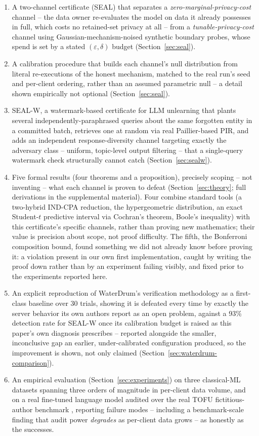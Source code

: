 \documentclass[10pt,journal,compsoc]{IEEEtran}
\begin{document}
\begin{enumerate}
\item A two-channel certificate (SEAL) that separates a \emph{zero-marginal-privacy-cost} channel -- the data owner re-evaluates the model on data it already possesses in full, which costs no retained-set privacy at all -- from a \emph{tunable-privacy-cost} channel using Gaussian-mechanism-noised synthetic boundary probes, whose spend is set by a stated $(\varepsilon,\delta)$ budget (Section~\ref{sec:seal}).
\item A calibration procedure that builds each channel's null distribution from literal re-executions of the honest mechanism, matched to the real run's seed and per-client ordering, rather than an assumed parametric null -- a detail shown empirically not optional (Section~\ref{sec:seal}).
\item SEAL-W, a watermark-based certificate for LLM unlearning that plants several independently-paraphrased queries about the same forgotten entity in a committed batch, retrieves one at random via real Paillier-based PIR, and adds an independent response-diversity channel targeting exactly the adversary class -- uniform, topic-level output filtering -- that a single-query watermark check structurally cannot catch (Section~\ref{sec:sealw}).
\item Five formal results (four theorems and a proposition), precisely scoping -- not inventing -- what each channel is proven to defeat (Section~\ref{sec:theory}; full derivations in the supplemental material). Four combine standard tools (a two-hybrid IND-CPA reduction, the hypergeometric distribution, an exact Student-$t$ predictive interval via Cochran's theorem, Boole's inequality) with this certificate's specific channels, rather than proving new mathematics; their value is precision about scope, not proof difficulty. The fifth, the Bonferroni composition bound, found something we did not already know before proving it: a violation present in our own first implementation, caught by writing the proof down rather than by an experiment failing visibly, and fixed prior to the experiments reported here.
\item An explicit reproduction of WaterDrum's verification methodology \cite{lu2026waterdrum} as a first-class baseline over 30 trials, showing it is defeated every time by exactly the server behavior its own authors report as an open problem, against a 93\% detection rate for SEAL-W once its calibration budget is raised as this paper's own diagnosis prescribes -- reported alongside the smaller, inconclusive gap an earlier, under-calibrated configuration produced, so the improvement is shown, not only claimed (Section~\ref{sec:waterdrum-comparison}).
\item An empirical evaluation (Section~\ref{sec:experiments}) on three classical-ML datasets spanning three orders of magnitude in per-client data volume, and on a real fine-tuned language model audited over the real TOFU fictitious-author benchmark \cite{maini2024tofu}, reporting failure modes -- including a benchmark-scale finding that audit power \emph{degrades} as per-client data grows -- as honestly as the successes.
\end{enumerate}
\end{document}
